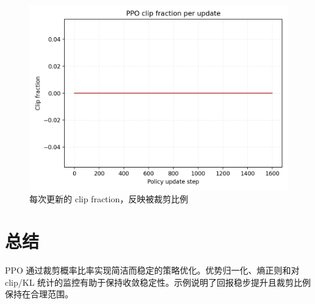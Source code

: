 \documentclass[UTF8,zihao=-4]{ctexart}
\begin{document}
\begin{figure}[H]
  \centering
  \includegraphics[width=0.82\linewidth]{ppo_clip_stats.png}
  \caption{每次更新的 clip fraction，反映被裁剪比例}
  \label{fig:ppo_clip_stats_cn}
\end{figure}

\FloatBarrier
\section{总结}
PPO 通过裁剪概率比率实现简洁而稳定的策略优化。优势归一化、熵正则和对 clip/KL 统计的监控有助于保持收敛稳定性。示例说明了回报稳步提升且裁剪比例保持在合理范围。
\end{document}
